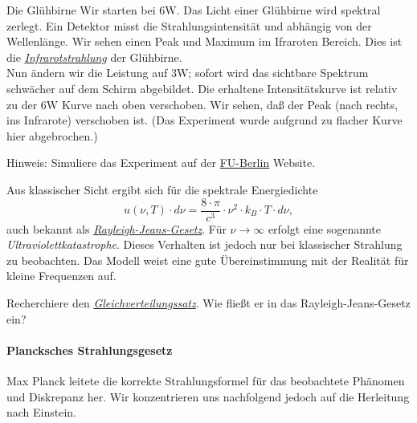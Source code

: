 \documentclass{subfiles}
\begin{document}
                \begin{Experiment}{Die Glühbirne}
                    Wir starten bei $6\si\watt$. Das Licht einer Glühbirne wird spektral zerlegt. Ein Detektor misst die Strahlungsintensität und abhängig von der Wellenlänge. Wir sehen einen Peak und Maximum im Ifraroten Bereich. Dies ist die \href{https://de.wikipedia.org/wiki/Infrarotstrahlung}{\emph{Infrarotstrahlung}} der Glühbirne.\\
                    
                    Nun ändern wir die Leistung auf $3\si\watt$; sofort wird das sichtbare Spektrum schwächer auf dem Schirm abgebildet. Die erhaltene Intensitätskurve ist relativ zu der $6\si\watt$ Kurve nach oben verschoben. Wir sehen, daß der Peak (nach rechts, ins Infrarote) verschoben ist. (Das Experiment wurde aufgrund zu flacher Kurve hier abgebrochen.)

                    Hinweis: Simuliere das Experiment auf der \href{https://tetfolio.fu-berlin.de/web/1089581}{FU-Berlin} Website.
                \end{Experiment}

                \noindent Aus klassischer Sicht ergibt sich für die spektrale Energiedichte 
                \[u(\nu,T)\cdot d\nu = \frac{8\cdot\pi}{c^3}\cdot\nu^2\cdot k_B\cdot T\cdot d\nu,\]
                auch bekannt als \href{https://de.wikipedia.org/wiki/Rayleigh-Jeans-Gesetz}{\emph{Rayleigh-Jeans-Gesetz}}. Für $\nu\to\infty$ erfolgt eine sogenannte \emph{Ultraviolettkatastrophe}. Dieses Verhalten ist jedoch nur bei klassischer Strahlung zu beobachten. Das Modell weist eine gute Übereinstimmung mit der Realität für kleine Frequenzen auf.

                \begin{Aufgabe}
                    \nr{} Recherchiere den \href{https://de.wikipedia.org/wiki/Gleichverteilungssatz}{\emph{Gleichverteilungssatz}}. Wie fließt er in das Rayleigh-Jeans-Gesetz ein?
                \end{Aufgabe}

            \paragraph*{Plancksches Strahlungsgesetz}
                Max Planck leitete die korrekte Strahlungsformel für das beobachtete Phänomen und Diskrepanz her. Wir konzentrieren uns nachfolgend jedoch auf die Herleitung nach Einstein. \\
\end{document}
